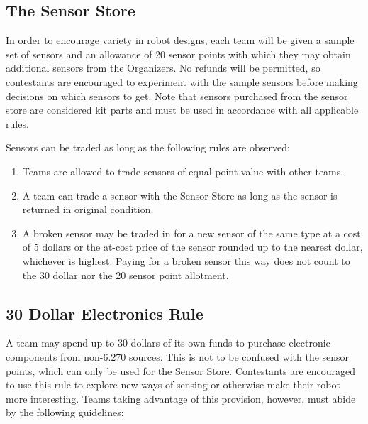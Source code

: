 \subsection{The Sensor Store}

In order to encourage variety in robot designs, each team will be
given a sample set of sensors and an allowance of 20 sensor points
with which they may obtain additional sensors from the Organizers. No
refunds will be permitted, so contestants are encouraged to experiment
with the sample sensors before making decisions on which sensors to
get. Note that sensors purchased from the sensor store are considered
kit parts and must be used in accordance with all applicable rules.

Sensors can be traded as long as the following rules are observed:

\begin{enumerate}

 \item Teams are allowed to trade sensors of equal point value with
 other teams.

 \item A team can trade a sensor with the Sensor Store as long as the
 sensor is returned in original condition.

 \item A broken sensor may be traded in for a new sensor of the same
 type at a cost of 5 dollars or the at-cost price of the sensor
 rounded up to the nearest dollar, whichever is highest.  Paying for a
 broken sensor this way does not count to the 30 dollar nor the 20
 sensor point allotment.
\end{enumerate}

\subsection{30 Dollar Electronics Rule}

A team may spend up to 30 dollars of its own funds to purchase
electronic components from non-6.270 sources. This is not to be
confused with the sensor points, which can only be used for the Sensor
Store. Contestants are encouraged to use this rule to explore new ways
of sensing or otherwise make their robot more interesting. Teams
taking advantage of this provision, however, must abide by the
following guidelines:

